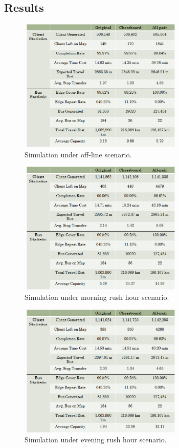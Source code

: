 \documentclass{sig-alternate}
\begin{document}
\subsection{Results}

\begin{figure}
\centering
\includegraphics[height=2.5in, width=3.1in]{result1.eps}
\caption{Simulation under off-line scenario.}
\label{fig:exp1}
\end{figure}

\begin{figure}
\centering
\includegraphics[height=2.5in, width=3.1in]{result2.eps}
\caption{Simulation under morning rush hour scenario.}
\label{fig:exp2}
\end{figure}

\begin{figure}
\centering
\includegraphics[height=2.5in, width=3.1in]{result3.eps}
\caption{Simulation under evening rush hour scenario.}
\label{fig:exp3}
\end{figure}
\end{document}
